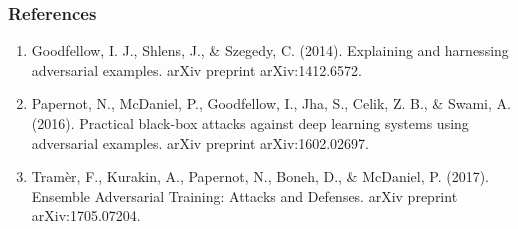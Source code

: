 \documentclass[9pt]{beamer}
\begin{document}
\begin{frame}
  \frametitle{References}

  {\footnotesize
    \begin{enumerate}
    \item Goodfellow, I. J., Shlens, J., \& Szegedy,
      C. (2014). Explaining and harnessing adversarial
      examples. arXiv preprint arXiv:1412.6572.
    \item Papernot, N., McDaniel, P., Goodfellow, I., Jha, S., Celik,
      Z. B., \& Swami, A. (2016). Practical black-box attacks against
      deep learning systems using adversarial examples. arXiv preprint
      arXiv:1602.02697.
    \item Tramèr, F., Kurakin, A., Papernot, N., Boneh, D., \&
      McDaniel, P. (2017). Ensemble Adversarial Training: Attacks and
      Defenses. arXiv preprint arXiv:1705.07204.
    \end{enumerate}
  }

\end{frame}

\appendix
\end{document}
